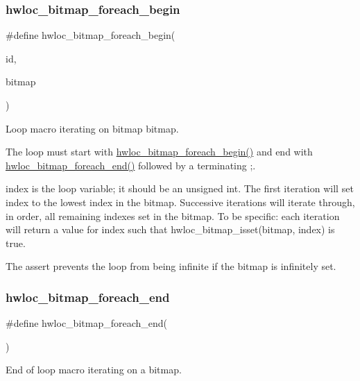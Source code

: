 \subsubsection{\texorpdfstring{hwloc\+\_\+bitmap\+\_\+foreach\+\_\+begin}{hwloc\_bitmap\_foreach\_begin}}
{\footnotesize\ttfamily \#define hwloc\+\_\+bitmap\+\_\+foreach\+\_\+begin(\begin{DoxyParamCaption}\item[{}]{id,  }\item[{}]{bitmap }\end{DoxyParamCaption})}



Loop macro iterating on bitmap {\ttfamily bitmap}. 

The loop must start with \hyperlink{a00205_ga3f6861045a8029ade373510ffa727d2a}{hwloc\+\_\+bitmap\+\_\+foreach\+\_\+begin()} and end with \hyperlink{a00205_gafcf3246db406218d4e155735b3fa6528}{hwloc\+\_\+bitmap\+\_\+foreach\+\_\+end()} followed by a terminating \textquotesingle{};\textquotesingle{}.

{\ttfamily index} is the loop variable; it should be an unsigned int. The first iteration will set {\ttfamily index} to the lowest index in the bitmap. Successive iterations will iterate through, in order, all remaining indexes set in the bitmap. To be specific\+: each iteration will return a value for {\ttfamily index} such that hwloc\+\_\+bitmap\+\_\+isset(bitmap, index) is true.

The assert prevents the loop from being infinite if the bitmap is infinitely set. \mbox{\label{a00205_gafcf3246db406218d4e155735b3fa6528}} 
\subsubsection{\texorpdfstring{hwloc\+\_\+bitmap\+\_\+foreach\+\_\+end}{hwloc\_bitmap\_foreach\_end}}
{\footnotesize\ttfamily \#define hwloc\+\_\+bitmap\+\_\+foreach\+\_\+end(\begin{DoxyParamCaption}{ }\end{DoxyParamCaption})}



End of loop macro iterating on a bitmap. 

